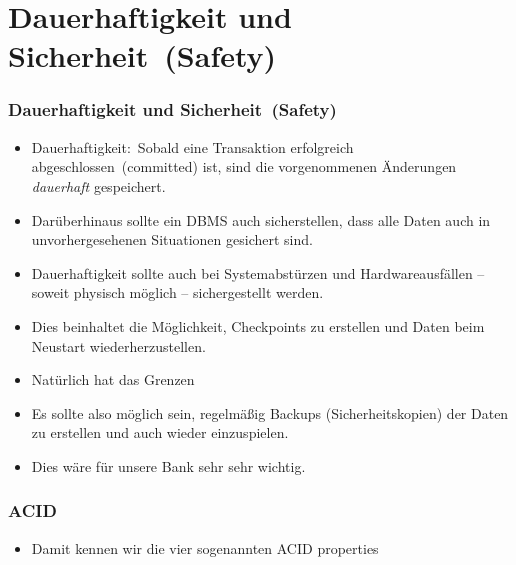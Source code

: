 \documentclass[aspectratio=169,mathserif,notheorems]{beamer}%
\begin{document}
\section{Dauerhaftigkeit und Sicherheit~(Safety)}%
\begin{frame}%
\frametitle{Dauerhaftigkeit und Sicherheit~(Safety)}
\begin{itemize}%
\item \alert{Dauerhaftigkeit}:~Sobald eine Transaktion erfolgreich abgeschlossen~(committed) ist, sind die vorgenommenen Änderungen \emph{dauerhaft} gespeichert.%
\item<2-> Darüberhinaus sollte ein DBMS auch sicherstellen, dass alle Daten auch in unvorhergesehenen Situationen gesichert sind.%
\item<3-> Dauerhaftigkeit sollte auch bei Systemabstürzen und Hardwareausfällen -- soweit physisch möglich -- sichergestellt werden.%
\item<4-> Dies beinhaltet die Möglichkeit, Checkpoints zu erstellen und Daten beim Neustart wiederherzustellen.%
\item<5-> Natürlich hat das Grenzen%
\item<7-> Es sollte also möglich sein, regelmäßig Backups (Sicherheitskopien) der Daten zu erstellen und auch wieder einzuspielen.%
\item<8-> Dies wäre für unsere Bank sehr sehr wichtig.%
\end{itemize}%
\end{frame}%

\begin{frame}%
\frametitle{ACID}
\begin{itemize}%
\item Damit kennen wir die vier sogenannten \alert{ACID properties}~\cite{GR1992TPCAT,WV2001TISTAATPOCCAR}%
\end{itemize}%
\end{frame}%
%
\end{document}
